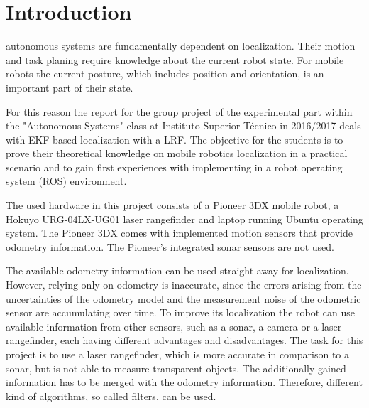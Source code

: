 \section{Introduction}
\label{sec:Introduction}


% 
% 
% 
% 
 autonomous systems are fundamentally dependent on localization. Their motion and task planing require knowledge about the current robot state. For mobile robots the current posture, which includes position and orientation, is an important part of their state. 

For this reason the report for the group project of the experimental part within the "Autonomous Systems" class at Instituto Superior T\'{e}cnico in 2016/2017 deals with EKF-based localization with a LRF. The objective for the students is to prove their theoretical knowledge on mobile robotics localization in a practical scenario and to gain first experiences with implementing in a robot operating system (ROS) environment. 

The used hardware in this project consists of a Pioneer 3DX mobile robot, a Hokuyo URG-04LX-UG01 laser rangefinder and laptop running Ubuntu operating system. The Pioneer 3DX comes with implemented motion sensors that provide odometry information. The Pioneer's integrated sonar sensors are not used.

The available odometry information can be used straight away for localization. However, relying only on odometry is inaccurate, since the errors arising from the uncertainties of the odometry model and the measurement noise of the odometric sensor are accumulating over time. To improve its  localization the robot can use available information from other sensors, such as a sonar, a camera or a laser rangefinder, each having different advantages and disadvantages.  The task for this project is to use a laser rangefinder, which is more accurate in comparison to a sonar, but is not able to measure transparent objects. The additionally gained information has to be merged with the odometry information. Therefore, different kind of algorithms, so called filters, can be used. \cite{Thrun}

